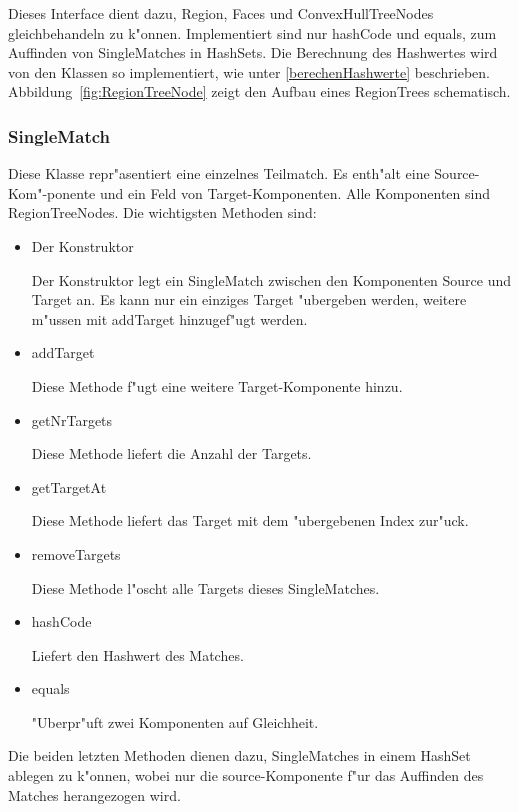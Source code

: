 Dieses Interface dient dazu, Region, Faces und ConvexHullTreeNodes gleichbehandeln zu k"onnen. Implementiert sind nur hashCode und equals, zum Auffinden von SingleMatches in HashSets. Die Berechnung des Hashwertes wird von den Klassen so implementiert, wie unter \ref{berechenHashwerte} beschrieben. Abbildung~\ref{fig:RegionTreeNode} zeigt den Aufbau eines RegionTrees schematisch.




\subsubsection{SingleMatch}
Diese Klasse repr"asentiert eine einzelnes Teilmatch.  Es enth"alt eine Source-Kom"-ponente und ein Feld von Target-Komponenten. Alle Komponenten sind RegionTreeNodes.
Die wichtigsten Methoden sind:

\begin{itemize}
\item Der Konstruktor

Der Konstruktor legt ein SingleMatch zwischen den Komponenten Source und Target an. Es kann nur ein einziges Target "ubergeben werden, weitere m"ussen mit addTarget hinzugef"ugt werden.



\item addTarget

Diese Methode f"ugt eine weitere Target-Komponente hinzu.

\item getNrTargets

Diese Methode liefert die Anzahl der Targets.

\item getTargetAt

Diese Methode liefert das Target mit dem "ubergebenen Index zur"uck.

\item removeTargets

Diese Methode l"oscht alle Targets dieses SingleMatches.

\item hashCode

Liefert den Hashwert des Matches.

\item equals

"Uberpr"uft zwei Komponenten auf Gleichheit.

\end{itemize}

Die beiden letzten Methoden dienen dazu, SingleMatches in einem HashSet ablegen zu k"onnen, wobei nur die source-Komponente f"ur das Auffinden des Matches herangezogen wird.

